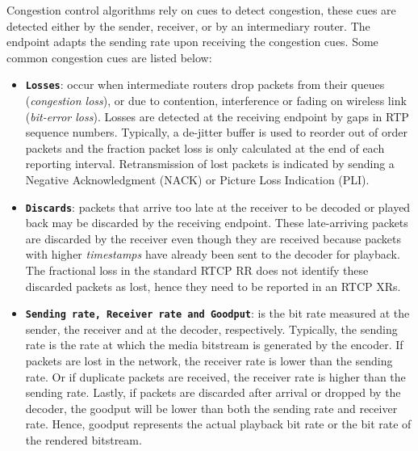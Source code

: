 Congestion control algorithms rely on cues to detect congestion, these cues
are detected either by the sender, receiver, or by an intermediary router. The
endpoint adapts the sending rate upon receiving the congestion cues. Some
common congestion cues are listed below:

\begin{itemize}
\setlength{\itemsep}{0pt}

\item \textbf{\texttt{Losses}}: occur when intermediate routers drop packets
from their queues (\emph{congestion loss}), or due to contention, interference
or fading on wireless link (\emph {bit-error loss}). Losses are detected at
the receiving endpoint by gaps in RTP sequence numbers. Typically, a de-jitter
buffer is used to reorder out of order packets and the fraction packet loss is
only calculated at the end of each reporting interval. Retransmission of lost
packets is indicated by sending a Negative Acknowledgment (NACK) or Picture
Loss Indication (PLI).

\item \textbf{\texttt{Discards}}: packets that arrive too late at the receiver
to be decoded or played back may be discarded by the receiving endpoint. These
late-arriving packets are discarded by the receiver even though they are
received because packets with higher \textit{timestamps} have already been
sent to the decoder for playback. The fractional loss in the standard RTCP RR
does not identify these discarded packets as lost, hence they need to be
reported in an RTCP XRs.

\item \textbf{\texttt{Sending rate, Receiver rate and Goodput}}: is the bit
rate measured at the sender, the receiver and at the decoder, respectively.
Typically, the sending rate is the rate at which the media bitstream is
generated by the encoder. If packets are lost in the network, the receiver
rate is lower than the sending rate. Or if duplicate packets are received, the
receiver rate is higher than the sending rate. Lastly, if packets are
discarded after arrival or dropped by the decoder, the goodput will be lower
than both the sending rate and receiver rate. Hence, goodput represents the
actual playback bit rate or the bit rate of the rendered bitstream.


\end{itemize}
